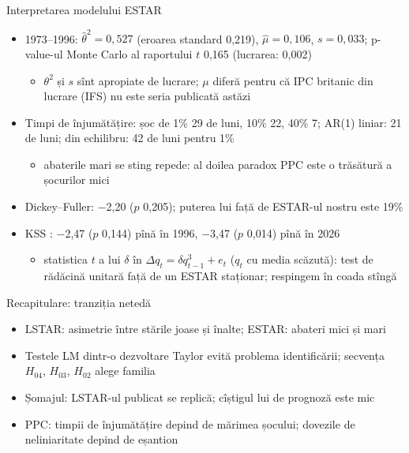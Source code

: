 \begin{frame}{Interpretarea modelului ESTAR}
\itemsize{\footnotesize}
\begin{itemize}
    \item 1973--1996: $\hat\theta^2 = 0{,}527$ (eroarea standard 0{,}219), $\hat\mu = 0{,}106$, $s = 0{,}033$; p-value-ul Monte Carlo al raportului $t$ 0{,}165 (lucrarea: 0,002)
    \begin{itemize}
        \item $\theta^2$ și $s$ sînt apropiate de lucrare; $\mu$ diferă pentru că IPC britanic din lucrare (IFS) nu este seria publicată astăzi
    \end{itemize}
    \item Timpi de înjumătățire: șoc de 1\% 29 de luni, 10\% 22, 40\% 7; AR(1) liniar: 21 de luni; din echilibru: 42 de luni pentru 1\%
    \begin{itemize}
        \item abaterile mari se sting repede: al doilea paradox PPC este o trăsătură a șocurilor mici
    \end{itemize}
    \item Dickey--Fuller: \ensuremath{-}2{,}20 ($p$ 0{,}205); puterea lui față de ESTAR-ul nostru este 19\%
    \item KSS : \ensuremath{-}2{,}47 ($p$ 0{,}144) pînă în 1996, \ensuremath{-}3{,}47 ($p$ 0{,}014) pînă în 2026
    \begin{itemize}
        \item statistica $t$ a lui $\delta$ în $\Delta q_t = \delta q_{t-1}^3 + e_t$ ($q_t$ cu media scăzută): test de rădăcină unitară față de un ESTAR staționar; respingem în coada stîngă
    \end{itemize}
\end{itemize}
\end{frame}

\begin{frame}{Recapitulare: tranziția netedă}
\itemsize{\small}
\begin{itemize}
    \item LSTAR: asimetrie între stările joase și înalte; ESTAR: abateri mici și mari
    \item Testele LM dintr-o dezvoltare Taylor evită problema identificării; secvența $H_{04}$, $H_{03}$, $H_{02}$ alege familia
    \item Șomajul: LSTAR-ul publicat se replică; cîștigul lui de prognoză este mic
    \item PPC: timpii de înjumătățire depind de mărimea șocului; dovezile de neliniaritate depind de eșantion
\end{itemize}
\end{frame}


